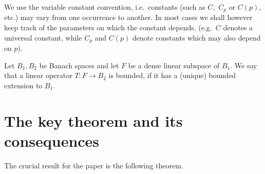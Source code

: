 \documentclass[leqno,12pt]{amsart}
\theoremstyle{definition}
\theoremstyle{remark}
\begin{document}
 We use the variable constant convention, i.e.\ constants (such as $C,$ $C_p$ or $C(p),$ etc.) may vary from one occurrence to another. In most cases we shall however keep track of the parameters on which the constant depends, (e.g.\ $C$ denotes a universal constant, while $C_p$ and $C(p)$ denote constants which may also depend on $p$).

 Let $B_1,B_2$ be Banach spaces and let $F$ be a dense linear subspace of $B_1.$ We say that a linear operator $T\colon F\to B_2$ is bounded, if it has a (unique) bounded extension to $B_1.$

\section{The key theorem and its consequences}
\label{sec:Riesz}
      The crucial result for the paper is the following theorem.
\end{document}

